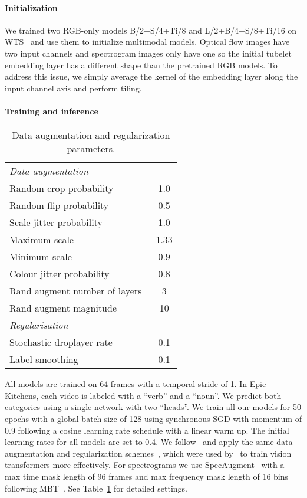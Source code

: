 \paragraph{Initialization} We trained two RGB-only models B/2+S/4+Ti/8 and L/2+B/4+S/8+Ti/16 on WTS~\cite{stroud2020learning} and use them to initialize multimodal models. Optical flow images have two input channels and spectrogram images only have one so the initial tubelet embedding layer has a different shape than the pretrained RGB models.
To address this issue, we simply average the kernel of the embedding layer along the input channel axis and perform tiling.

\paragraph{Training and inference}
\begin{table} 
	\centering
	\scriptsize{
\begin{tabular}{  l  c }
    \toprule
    \multicolumn{2}{l}{\textit{Data augmentation}}  \\
    Random crop probability & 1.0 \\
    Random flip probability & 0.5\\
    Scale jitter probability	& 1.0 \\
    Maximum scale			  & 1.33 \\
    Minimum scale			  & 0.9 \\
    Colour jitter probability  & 0.8 \\
    Rand augment number of layers~\cite{cubuk_arxiv_2019}		 & 3 \\
    Rand augment magnitude~\cite{cubuk_arxiv_2019} & 10  \\
    \midrule
    \multicolumn{2}{l}{\textit{Regularisation}} \\
    Stochastic droplayer rate~\cite{huang_stochasticdepth_eccv_2016} & 0.1 \\
    Label smoothing~\cite{szegedy_cvpr_2016} & 0.1 \\
    \bottomrule
   \end{tabular}
   }
	\caption{Data augmentation and regularization parameters.}
\label{tab:hparams}
\end{table}
 All models are trained on 64 frames with a temporal stride of 1. In Epic-Kitchens, each video is labeled with a ``verb'' and a ``noun''. We predict both categories using a single network with two ``heads''.
We train all our models for 50 epochs with a global batch size of 128 using synchronous SGD with momentum of 0.9 following a cosine learning rate schedule with a linear warm up. The initial learning rates for all models are set to 0.4. We follow~\cite{arnab2021vivit,yan2022multiview,dehghani2021scenic} and apply the same data augmentation and regularization schemes~\cite{huang_stochasticdepth_eccv_2016,cubuk_arxiv_2019,szegedy_cvpr_2016}, which were used by~\cite{touvron2021training} to train vision transformers more effectively. For spectrograms we use SpecAugment~\cite{park2019specaugment} with a max time mask length of 96 frames and max frequency mask length of 16 bins following MBT~\cite{nagrani2021attention}.  See Table~\ref{tab:hparams} for detailed settings.
